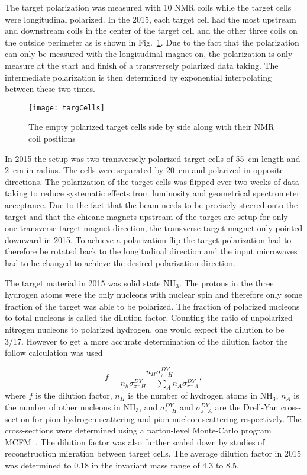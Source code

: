 The target polarization was measured with 10 NMR coils while the target cells
were longitudinal polarized.  In the 2015, each target cell had the most
upstream and downstream coils in the center of the target cell and the other
three coils on the outside perimeter as is shown in Fig.~\ref{fig::targCells}.
Due to the fact that the polarization can only be measured with the longitudinal
magnet on, the polarization is only measure at the start and finish of a
transversely polarized data taking.  The intermediate polarization is then
determined by exponential interpolating between these two times.

\begin{figure}[h!t]
  \centering
  \texttt{[image: targCells]}
  \caption{The empty polarized target cells side by side along with their NMR
    coil positions}
  \label{fig::targCells}
\end{figure}

In 2015 the setup was two transversely polarized target cells of 55~cm length
and 2~cm in radius.  The cells were separated by 20~cm and polarized in opposite
directions.  The polarization of the target cells was flipped ever two weeks of
data taking to reduce systematic effects from luminosity and geometrical
spectrometer acceptance.  Due to the fact that the beam needs to be precisely
steered onto the target and that the chicane magnets upstream of the target are
setup for only one transverse target magnet direction, the transverse target
magnet only pointed downward in 2015.  To achieve a polarization flip the target
polarization had to therefore be rotated back to the longitudinal direction and
the input microwaves had to be changed to achieve the desired polarization
direction. \par

The target material in 2015 was solid state NH$_3$.  The protons in the three
hydrogen atoms were the only nucleons with nuclear spin and therefore only some
fraction of the target was able to be polarized.  The fraction of polarized
nucleons to total nucleons is called the dilution factor.  Counting the ratio of
unpolarized nitrogen nucleons to polarized hydrogen, one would expect the
dilution to be 3/17.  However to get a more accurate determination of the
dilution factor the follow calculation was used

\begin{equation}
  f = \frac{n_H\sigma^{DY}_{\pi^-H}}
  {n_h\sigma^{DY}_{\pi^-H} + \sum_A n_A\sigma^{DY}_{\pi^-A}},
  \label{equ::dilution}
\end{equation}
where $f$ is the dilution factor, $n_H$ is the number of hydrogen atoms in
NH$_3$, $n_A$ is the number of other nucleons in NH$_3$, and
$\sigma^{DY}_{\pi^-H}$ and $\sigma^{DY}_{\pi^-A}$ are the Drell-Yan
cross-section for pion hydrogen scattering and pion nucleon scattering
respectively.  The cross-sections were determined using a parton-level
Monte-Carlo program MCFM~\cite{MCFM}.  The dilution factor was also further
scaled down by studies of reconstruction migration between target cells.  The
average dilution factor in 2015 was determined to 0.18 in the invariant mass
range of 4.3{\gvcs} to 8.5{\gvcs}.


